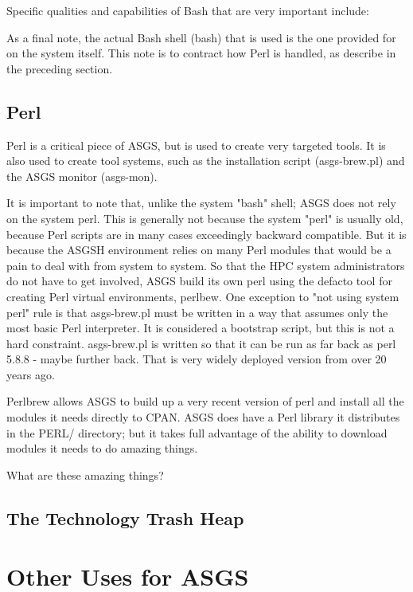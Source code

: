 \documentclass{article}
\begin{document}
Specific qualities and capabilities of Bash that are very important include:

As a final note, the actual Bash shell (bash) that is used is the one provided
for on the system itself. This note is to contract how Perl is handled, as
describe in the preceding section.

\subsection{Perl}

Perl is a critical piece of ASGS, but is used to create very targeted tools. It
is also used to create tool systems, such as the installation script
(asgs-brew.pl) and the ASGS monitor (asgs-mon).

It is important to note that, unlike the system "bash" shell; ASGS does not rely
on the system perl. This is generally not because the system "perl" is usually
old, because Perl scripts are in many cases exceedingly backward compatible. But
it is because the ASGSH environment relies on many Perl modules that would be a
pain to deal with from system to system. So that the HPC system administrators
do not have to get involved, ASGS build its own perl using the defacto tool for
creating Perl virtual environments, perlbew. One exception to "not using system
perl" rule is that asgs-brew.pl must be written in a way that assumes only the
most basic Perl interpreter. It is considered a bootstrap script, but this is
not a hard constraint. asgs-brew.pl is written so that it can be run as far back
as perl 5.8.8 - maybe further back. That is very widely deployed version from
over 20 years ago.

Perlbrew allows ASGS to build up a very recent version of perl and install all
the modules it needs directly to CPAN. ASGS does have a Perl library it
distributes in the PERL/ directory; but it takes full advantage of the ability
to download modules it needs to do amazing things.

What are these amazing things?

\subsection{The Technology Trash Heap}

\section{Other Uses for ASGS}
\end{document}
